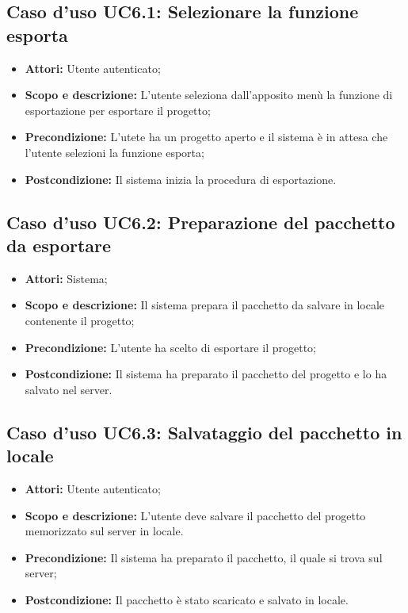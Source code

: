 \subsection{Caso d'uso UC6.1: Selezionare la funzione esporta}
	\begin{itemize}
		\item \textbf{Attori:} Utente autenticato;
		\item \textbf{Scopo e descrizione:} L'utente seleziona dall'apposito menù la funzione di esportazione per esportare il progetto;
		\item \textbf{Precondizione:} L'utete ha un progetto aperto e il sistema è in attesa che l'utente selezioni la funzione esporta;
		\item \textbf{Postcondizione:} Il sistema inizia la procedura di esportazione.
	\end{itemize}


\subsection{Caso d'uso UC6.2: Preparazione del pacchetto da esportare}
	\begin{itemize}
		\item \textbf{Attori:} Sistema;
		\item \textbf{Scopo e descrizione:} Il sistema prepara il pacchetto da salvare in locale contenente il progetto;
		\item \textbf{Precondizione:} L'utente ha scelto di esportare il progetto;
		\item \textbf{Postcondizione:} Il sistema ha preparato il pacchetto del progetto e lo ha salvato nel server.
	\end{itemize}


\subsection{Caso d'uso UC6.3: Salvataggio del pacchetto in locale}
	\begin{itemize}
		\item \textbf{Attori:} Utente autenticato;
		\item \textbf{Scopo e descrizione:} L'utente deve salvare il pacchetto del progetto memorizzato sul server in locale.
		\item \textbf{Precondizione:} Il sistema ha preparato il pacchetto, il quale si trova sul server;
		\item \textbf{Postcondizione:} Il pacchetto è stato scaricato e salvato in locale.
	\end{itemize}
